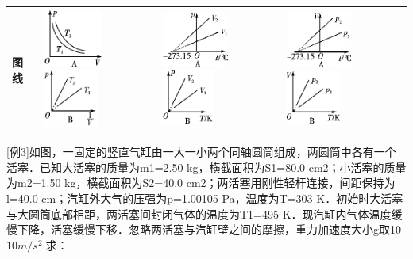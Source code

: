 \begin{longtable}[]{@{}llll@{}}
\begin{minipage}[t]{0.22\columnwidth}
图线\strut
\end{minipage} & \begin{minipage}[t]{0.22\columnwidth}\raggedright
\includegraphics[width=0.74514in,height=0.74514in]{media/image495.png}
\includegraphics[width=0.70764in,height=0.74514in]{media/image496.png}\strut
\end{minipage} & \begin{minipage}[t]{0.22\columnwidth}\raggedright
\includegraphics[width=0.84931in,height=0.70764in]{media/image497.png}
\includegraphics[width=0.67014in,height=0.69792in]{media/image498.png}\strut
\end{minipage} & \begin{minipage}[t]{0.22\columnwidth}\raggedright
\includegraphics[width=0.84931in,height=0.70764in]{media/image499.png}
\includegraphics[width=0.70764in,height=0.68889in]{media/image500.png}\strut
\end{minipage}\tabularnewline
\bottomrule
\end{longtable}

{[}例3{]}如图，一固定的竖直气缸由一大一小两个同轴圆筒组成，两圆筒中各有一个活塞．已知大活塞的质量为m1=2.50
kg，横截面积为S1=80.0 cm2；小活塞的质量为m2=1.50
kg，横截面积为S2=40.0 cm2；两活塞用刚性轻杆连接，间距保持为l=40.0
cm；汽缸外大气的压强为p=1.00105 Pa，温度为T=303
K．初始时大活塞与大圆筒底部相距，两活塞间封闭气体的温度为T1=495
K．现汽缸内气体温度缓慢下降，活塞缓慢下移．忽略两活塞与汽缸壁之间的摩擦，重力加速度大小g取10
$10m/s^2$.求：


